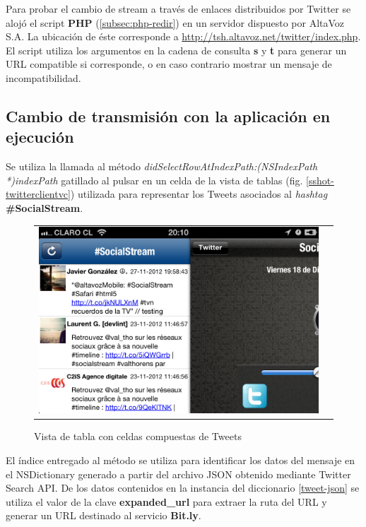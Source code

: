 Para probar el cambio de stream a través de enlaces distribuidos por Twitter se alojó el script \textbf{PHP} (\ref{subsec:php-redir}) en un servidor dispuesto por AltaVoz S.A. La ubicación de éste corresponde a \url{http://tsh.altavoz.net/twitter/index.php}.
El script utiliza los argumentos en la cadena de consulta \textbf{s} y \textbf{t} para generar un URL compatible si corresponde, o en caso contrario mostrar un mensaje de incompatibilidad.

  \subsection{Cambio de transmisión con la aplicación en ejecución}
  \label{subsec:ts-inside}
Se utiliza la llamada al método \textit{didSelectRowAtIndexPath:(NSIndexPath *)indexPath} gatillado al pulsar en un celda de la vista de tablas (fig. \ref{sshot-twitterclientvc}) utilizada para representar los Tweets asociados al \textit{hashtag} \textbf{\#SocialStream}. 

\begin{figure}[H]
	\centering
	\begin{tabular}{cc}
	\includegraphics[scale=0.28]{imgs/twclient-list.png}
	\end{tabular}
	\caption{Vista de tabla con celdas compuestas de Tweets}
	\label{fig:twclient-list}
\end{figure}

\enlargethispage{2\baselineskip}
El índice entregado al método se utiliza para identificar los datos del mensaje en el NSDictionary generado a partir del archivo JSON obtenido mediante Twitter Search API. De los datos contenidos en la instancia del diccionario \ref{tweet-json} se utiliza el valor de la clave \textbf{expanded\_url} para extraer la ruta del URL y generar un URL destinado al servicio \textbf{Bit.ly}.  \\

